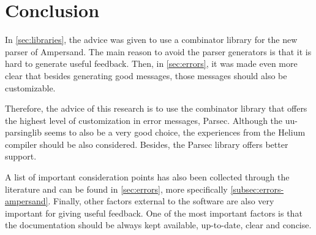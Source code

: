 
\section{Conclusion}
\label{sec:conclusion}
In \autoref{sec:libraries}, the advice was given to use a combinator library for the new parser of Ampersand.
The main reason to avoid the parser generators is that it is hard to generate useful feedback.
Then, in \autoref{sec:errors}, it was made even more clear that besides generating good messages, those messages should also be customizable.

Therefore, the advice of this research is to use the combinator library that offers the highest level of customization in error messages, Parsec.
Although the uu-parsinglib seems to also be a very good choice, the experiences from the Helium compiler  should be also considered.
Besides, the Parsec library offers better support.

A list of important consideration points has also been collected through the literature and can be found in \autoref{sec:errors}, more specifically \ref{subsec:errors-ampersand}.
Finally, other factors external to the software are also very important for giving useful feedback.
One of the most important factors is that the documentation should be always kept available, up-to-date, clear and concise.
